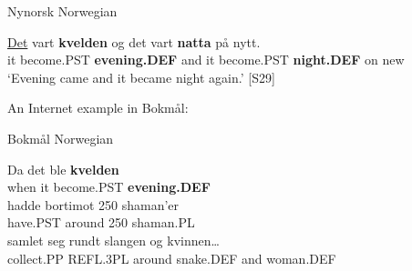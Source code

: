 
\item 

Nynorsk Norwegian



 \ea\label{}
\gll \href{http://kh.hd.uib.no/cgi-dos/roman-nn.bat?P3C383000#here}{Det}  vart  \textbf{kvelden} og  det  vart  \textbf{natta} på  nytt.\\


it  become.PST  \textbf{evening.DEF} and  it  become.PST  \textbf{night.DEF} on  new\\

\glt ‘Evening came and it became night again.’ [S29]

\z

An Internet example in Bokmål: 


\item 

Bokmål Norwegian



 \ea\label{}
\gll Da  det  ble  \textbf{kvelden} \\


when  it  become.PST  \textbf{evening.DEF} \\

 \ea\label{}
\gll hadde  bortimot  250  shaman’er\\


have.PST  around  250  shaman.PL\\

 \ea\label{}
\gll samlet  seg  rundt  slangen  og  kvinnen…\\


collect.PP  REFL.3PL  around  snake.DEF  and  woman.DEF\\

